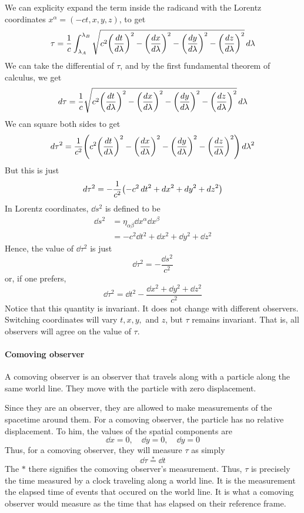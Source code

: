 		We can explicity expand the term inside the radicand
		with the Lorentz coordinates $x^\alpha = (-ct,x,y,z)$,
		to get
		\[
			\tau = 
			\frac{1}{c}\int_{\lambda_A}^{\lambda_B} 
			\sqrt{
				c^2 
				\qty(
					\dv{t}{\lambda} 
				)^2
				-
				\qty(
					\dv{x}{\lambda} 
				)^2
				-
				\qty(
					\dv{y}{\lambda} 
				)^2
				-
				\qty(
					\dv{z}{\lambda} 
				)^2
			}
			\dd{\lambda}
		\]
		We can take the differential of $\tau$, and by the first
		fundamental theorem of calculus, we get
		\[
			\dd{\tau} 
			=
			\frac{1}{c}
			\sqrt{
				c^2 
				\qty(
					\dv{t}{\lambda} 
				)^2
				-
				\qty(
					\dv{x}{\lambda} 
				)^2
				-
				\qty(
					\dv{y}{\lambda} 
				)^2
				-
				\qty(
					\dv{z}{\lambda} 
				)^2
			}
			\dd{\lambda}
		\]
		We can square both sides to get
		\[
			\dd{\tau}^2
			=
			\frac{1}{c^2}
			\pqty{
				c^2 
				\qty(
					\dv{t}{\lambda} 
				)^2
				-
				\qty(
					\dv{x}{\lambda} 
				)^2
				-
				\qty(
					\dv{y}{\lambda} 
				)^2
				-
				\qty(
					\dv{z}{\lambda} 
				)^2
			}
			\dd{\lambda}^2
		\]
		But this is just
		\[
			\dd{\tau^2}
			=
			-
			\frac{1}{c^2}
			\pqty{
				-c^2\dd{t}^2
				+
				\dd{x}^2
				+
				\dd{y}^2
				+
				\dd{z}^2
			}
		\]
		In Lorentz coordinates, $\dd{s}^2$ is defined to be
		\begin{align*}
			\dd{s}^2 
			&= 
			\eta_{\alpha\beta}\dd{x^\alpha}\dd{x^\beta}\\
			&=
				-c^2\dd{t}^2
				+
				\dd{x}^2
				+
				\dd{y}^2
				+
				\dd{z}^2
		\end{align*}
		Hence, the value of $\dd{\tau}^2$ is just
		\[
			\dd{\tau^2}
			=
			-
			\frac{\dd{s^2}}{c^2} 
		\]
		or, if one prefers,
		\[
			\dd{\tau^2}
			=
			\dd{t}^2
			-
			\frac{
				\dd{x}^2
				+
				\dd{y}^2
				+
				\dd{z}^2
			}{c^2} 
		\]
		Notice that this quantity is invariant. 
		It does not change with different observers.
		Switching coordinates will vary $t,x,y,$ and $z$,
		but $\tau$ remains invariant. That is,
		all observers will agree on the value of $\tau$. 

		\paragraph{Comoving observer}

		A comoving observer is an observer that travels along
		with a particle along the same world line. They move with
		the particle with zero displacement. 

		Since they are an observer, they are allowed
		to make measurements of the spacetime around them.
		For a comoving observer, the particle has no relative 
		displacement. To him, the values of the spatial components are
		\[
			\dd{x} = 0,\quad \dd{y}=0,\quad \dd{y} = 0
		\]
		Thus, for a comoving observer, they will measure $\tau$ as simply
		\[
			\dd{\tau} 
			\overset{*}{=}
			\dd{t}
		\]
		The $*$ there signifies the comoving observer's measurement.
		Thus, $\tau$ is precisely the time measured by a clock traveling 
		along a world line. It is the measurement the elapsed time of events 
		that occured on the world line. It is what a comoving observer would measure as 
		the time that has elapsed on their reference frame.


